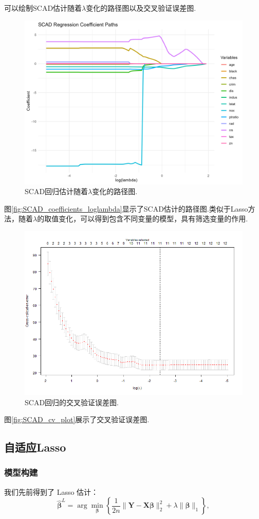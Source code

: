 \documentclass[12pt, a4paper, oneside]{ctexart}
\begin{document}
	可以绘制SCAD估计随着$\lambda$变化的路径图以及交叉验证误差图.
	\begin{figure}[H]
		\small
		\centering
		\includegraphics[width=0.75\columnwidth]{../Figure/SCAD_coefficients_loglambda.png}
		\caption{SCAD回归估计随着$\lambda$变化的路径图.}
		\label{fig:SCAD_coefficients_loglambda}
	\end{figure}
	图\eqref{fig:SCAD_coefficients_loglambda}显示了SCAD估计的路径图.类似于Lasso方法，随着$\lambda$的取值变化，可以得到包含不同变量的模型，具有筛选变量的作用.
	\begin{figure}[H]
		\small
		\centering
		\includegraphics[width=0.75\columnwidth]{../Figure/SCAD_cv_plot.png}
		\caption{SCAD回归的交叉验证误差图.}
		\label{fig:SCAD_cv_plot}
	\end{figure}
	图\eqref{fig:SCAD_cv_plot}展示了交叉验证误差图.
	
	\subsection{自适应Lasso}
	\subsubsection{模型构建}
	我们先前得到了 Lasso 估计：
	\begin{equation}
		\hat{\bm{\beta}}^L = \arg\min_{\bm{\beta}} \left\{ \frac{1}{2n} \|\bm{Y} - \bm{X}\bm{\beta} \|_2^2 + \lambda \|\bm{\beta} \|_1 \right\},
	\end{equation}
	
\end{document}
